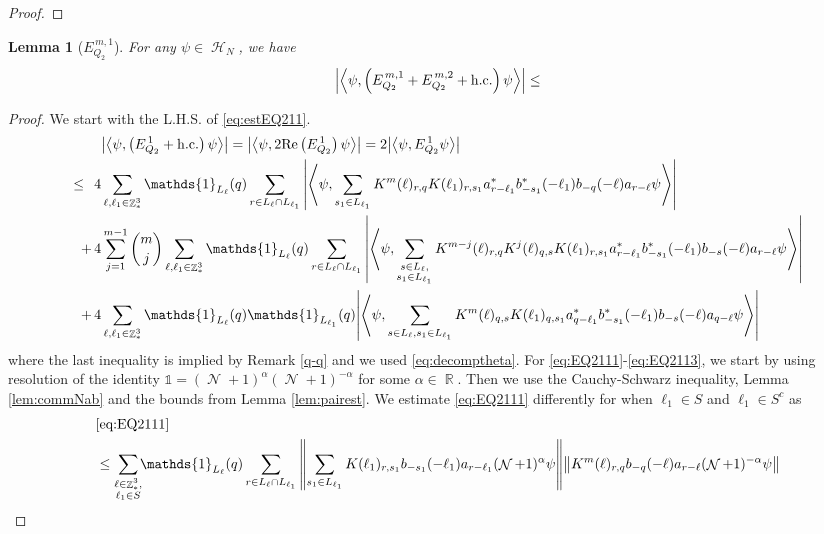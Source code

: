 \documentclass[12pt,a4paper]{article}
\numberwithin{equation}{section}
\newcommand{\1}{\mathbb{I}}
\DeclareMathOperator{\R}{\mathbb{R}}
\DeclareMathOperator{\Z}{\mathbb{Z}}
\DeclareMathOperator{\HH}{\mathcal{H}}
\DeclareMathOperator{\NN}{\mathcal{N}}
\newcommand{\eva}[1]{\left\langle #1 \right\rangle}
\theoremstyle{plain}
\newtheorem{lemma}[theorem]{Lemma}
\theoremstyle{definition}
\theoremstyle{remark}
\theoremstyle{plain}
\theoremstyle{definition}
\theoremstyle{remark}
\begin{document}
\begin{proof}
\end{proof}
\begin{lemma}[$E_{Q_2}^{\,m,1}$]\label{lem:EQ211}
	For any $\psi \in \HH_N$, we have
	\begin{align}
		\abs{\eva{\psi,\left(E^{\,m,1}_{Q_2}+E^{\,m,2}_{Q_2}+\mathrm{h.c.}\right) \psi }}
		\leq \label{eq:estEQ211}
	\end{align}
\end{lemma}
\begin{proof}
	We start with the L.H.S. of \eqref{eq:estEQ211}.
	\begin{align}
		&\abs{\eva{\psi,\left(E^{\,1}_{Q_2}+\mathrm{h.c.}\right) \psi }} = \abs{\eva{\psi,2\mathrm{Re}\left(E^{\,1}_{Q_2}\right) \psi }} = 2\abs{\eva{\psi, E^{\,1}_{Q_2} \psi }}\nonumber\\
		\leq\,\;4& \sum\limits_{\ell, \ell_1\in \Z^3_*} \mathds{1}_{L_{\ell}}(q) \sum\limits_{r\in L_{\ell} \cap L_{\ell_1}} \abs{\eva{\psi, \sum\limits_{s_1\in L_{\ell_1}} K^m(\ell )_{r,q} K(\ell_1)_{r,s_1} a^*_{r-\ell_1}  b^*_{-s_1}(-\ell_1) b_{-q}(-\ell) a_{r-\ell}  \psi }}\label{eq:EQ2111}\\
		+\,4& \sum\limits_{j=1}^{m-1} {{m}\choose j} \sum\limits_{\ell, \ell_1\in \Z^3_*}\mathds{1}_{L_{\ell}}(q) \sum\limits_{r\in L_{\ell} \cap L_{\ell_1}}  \abs{\eva{\psi, \sum\limits_{\substack{s \in L_{\ell},\\ s_1\in L_{\ell_1}}} K^{m-j}(\ell)_{r,q} K^{j}(\ell)_{q,s} K(\ell_1)_{r,s_1} a^*_{r-\ell_1} b^*_{-s_1}(-\ell_1) b_{-s}(-\ell) a_{r-\ell} \psi }}\label{eq:EQ2112}\\
		+\,4&\sum\limits_{\ell, \ell_1\in \Z^3_*} \mathds{1}_{L_{\ell}}(q) \mathds{1}_{L_{\ell_1}}(q) \abs{\eva{\psi,  \sum\limits_{s \in L_{\ell}, s_1\in L_{\ell_1}} K^m(\ell)_{q,s}K(\ell_1)_{q,s_1}
				a^*_{q-\ell_1} b^*_{-s_1}(-\ell_1) b_{-s}(-\ell) a_{q-\ell} \psi}} \label{eq:EQ2113}
	\end{align}
	where the last inequality is implied by Remark \ref{q-q} and we used \eqref{eq:decomptheta}.
	For \eqref{eq:EQ2111}-\eqref{eq:EQ2113}, we start by using resolution of the identity $\mathds{1} = (\NN+1)^{\alpha}(\NN+1)^{-\alpha}$ for some $\alpha \in \R$. Then we use the Cauchy-Schwarz inequality, Lemma \ref{lem:commNab} and the bounds from Lemma \ref{lem:pairest}. We estimate \eqref{eq:EQ2111} differently for when $\ell_1 \in S$ and $\ell_1 \in S^c$ as
	\begin{align}
		&\eqref{eq:EQ2111}\nonumber\\
		&\leq\sum\limits_{\substack{\ell \in \Z^3_*,\\\ell_1 \in S}} \!\!\mathds{1}_{L_\ell}(q) \sum\limits_{ r \in L_\ell \cap L_{\ell_1}}    \norm{ \sum\limits_{s_1 \in L_{\ell_1}} K(\ell_1)_{r,s_1} b_{-s_1}(-\ell_1)  a_{r-\ell_1} (\NN+1)^{\alpha}\psi}\norm{ K^{m}(\ell)_{r,q}   b_{-q}(-\ell) a_{r-\ell} (\NN+1)^{-\alpha}\psi } \nonumber\\

\end{align}
\end{proof}
\end{document}
